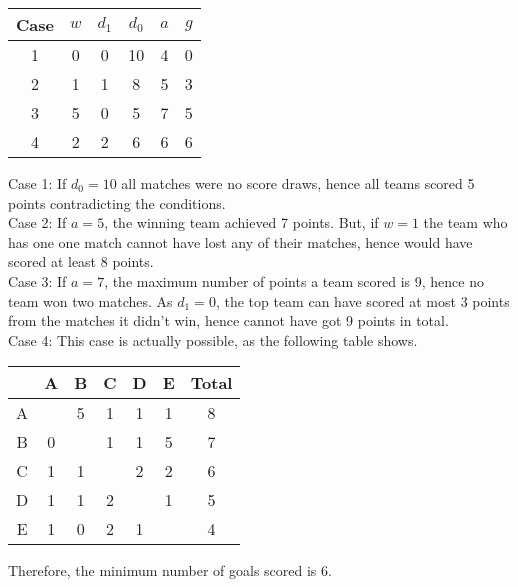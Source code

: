 \documentclass{article}
\begin{document}
\begin{enumerate}[1.]
\begin{table}[ht!]
	\begin{center}
	  \begin{tabular}{ | c | c | c | c | c | c |}
		  \hline
		  Case &  $w$ & $d_1$ & $d_0$ & $a$ & $g$ \\
		  \hline  
		  1 & 0 & 0 & 10 & 4 & 0 \\
		  \hline  
		  2 & 1 & 1 &  8 & 5 & 3 \\
		  \hline  
		  3 & 5 & 0 &  5 & 7 & 5 \\
		  \hline
		  4 & 2 & 2 &  6 & 6 & 6\\
		  \hline  
	  \end{tabular}
	\end{center}
\end{table}

Case 1: If $d_0 = 10$ all matches were no score draws, hence all teams scored 5 points contradicting the conditions.\\
Case 2: If $a = 5$, the winning team achieved 7 points. But, if $w = 1$ the team who has one one match cannot have lost any of their matches, hence would have scored at least 8 points.\\
Case 3: If $a = 7$, the maximum number of points a team scored is 9, hence no team won two matches. As $d_1 = 0$, the top team can have scored at most 3 points from the matches it didn't win, hence cannot have got 9 points in total.\\
Case 4: This case is actually possible, as the following table shows.
\begin{table}[ht!]
	\begin{center}
	  \begin{tabular}{ | c | c | c | c | c | c | c |}
		  \hline
		    & A & B & C & D & E & Total\\
		  \hline  
		  A &   & 5 & 1 & 1 & 1 & 8\\
		  \hline  
		  B & 0 &   & 1 & 1 & 5 & 7\\
		  \hline  
		  C & 1 & 1 &   & 2 & 2 & 6\\
		  \hline  
		  D & 1 & 1 & 2 &   & 1 & 5\\
		  \hline  
		  E & 1 & 0 & 2 & 1 &   & 4\\
		  \hline  
	  \end{tabular}
	\end{center}
\end{table}

Therefore, the minimum number of goals scored is 6.



\end{enumerate}
\end{document}
